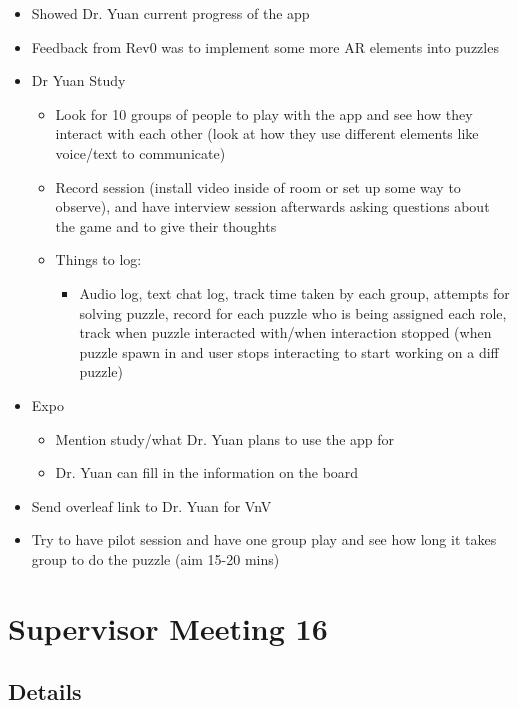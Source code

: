 \documentclass{article}
\begin{document}
\begin{itemize}
    \item Showed Dr. Yuan current progress of the app
    \item Feedback from Rev0 was to implement some more AR elements into puzzles
    \item Dr Yuan Study
    \begin{itemize}
        \item Look for 10 groups of people to play with the app and see how they interact with each other (look at how they use different elements like voice/text to communicate)
        \item Record session (install video inside of room or set up some way to observe), and have interview session afterwards asking questions about the game and to give their thoughts
        \item Things to log:
        \begin{itemize}
            \item Audio log, text chat log, track time taken by each group, attempts for solving puzzle, record for each puzzle who is being assigned each role, track when puzzle interacted with/when interaction stopped (when puzzle spawn in and user stops interacting to start working on a diff puzzle)
        \end{itemize}
    \end{itemize}
    \item Expo
    \begin{itemize}
        \item Mention study/what Dr. Yuan plans to use the app for
        \item Dr. Yuan can fill in the information on the board
    \end{itemize}
    \item Send overleaf link to Dr. Yuan for VnV
    \item Try to have pilot session and have one group play and see how long it takes group to do the puzzle (aim 15-20 mins)
    
\end{itemize}

\pagebreak

\section*{Supervisor Meeting 16}

\subsection*{Details}
\end{document}
